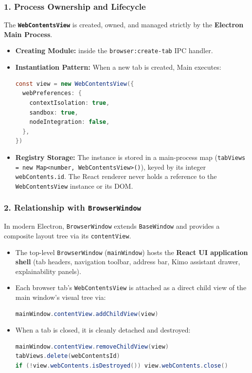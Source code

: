 \documentclass[11pt,a4paper]{article}
\newcommand{\pth}[1]{\texttt{\seqsplit{#1}}}
\begin{document}
\subsubsection{1. Process Ownership and Lifecycle}
The \textbf{\texttt{WebContentsView}} is created, owned, and managed strictly by the \textbf{Electron Main Process}.
\begin{itemize}[leftmargin=1.4em]
\item \textbf{Creating Module:} \pth{frontend/electron/main.ts} inside the \texttt{browser:create-tab} IPC handler.
\item \textbf{Instantiation Pattern:} When a new tab is created, Main executes:
\begin{lstlisting}[language=java]
const view = new WebContentsView({
  webPreferences: {
    contextIsolation: true,
    sandbox: true,
    nodeIntegration: false,
  },
})
\end{lstlisting}
\item \textbf{Registry Storage:} The instance is stored in a main-process map (\texttt{tabViews = new Map<number, WebContentsView>()}), keyed by its integer \texttt{webContents.id}. The React renderer never holds a reference to the \texttt{WebContentsView} instance or its DOM.
\end{itemize}

\subsubsection{2. Relationship with \texttt{BrowserWindow}}
In modern Electron, \texttt{BrowserWindow} extends \texttt{BaseWindow} and provides a composite layout tree via its \texttt{contentView}.
\begin{itemize}[leftmargin=1.4em]
\item The top-level \texttt{BrowserWindow} (\texttt{mainWindow}) hosts the \textbf{React UI application shell} (tab headers, navigation toolbar, address bar, Kimo assistant drawer, explainability panels).
\item Each browser tab's \texttt{WebContentsView} is attached as a direct child view of the main window's visual tree via:
\begin{lstlisting}[language=java]
mainWindow.contentView.addChildView(view)
\end{lstlisting}
\item When a tab is closed, it is cleanly detached and destroyed:
\begin{lstlisting}[language=java]
mainWindow.contentView.removeChildView(view)
tabViews.delete(webContentsId)
if (!view.webContents.isDestroyed()) view.webContents.close()
\end{lstlisting}
\end{itemize}
\end{document}
